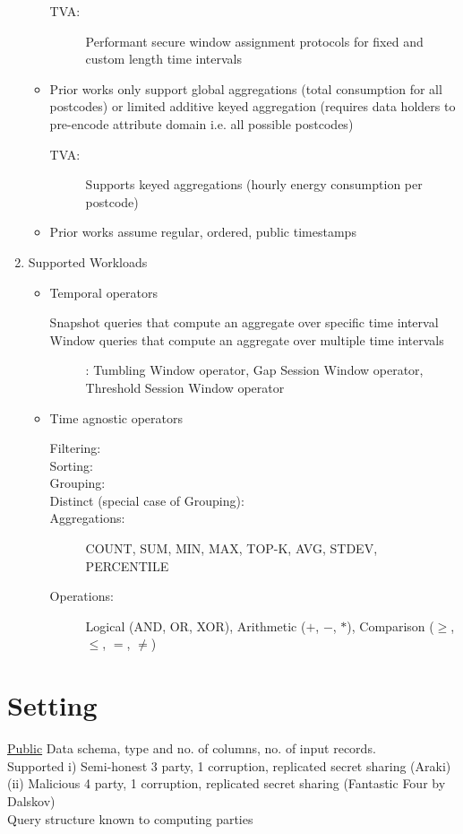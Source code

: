 \documentclass{article}
\begin{document}
\begin{enumerate}
\begin{itemize}
\begin{description}
            \item[TVA:] Performant secure window assignment protocols for fixed and custom length time intervals
        \end{description}
       \item Prior works only support global aggregations (total consumption for all postcodes) or limited additive keyed aggregation (requires data holders to pre-encode attribute domain i.e. all possible postcodes)
         \begin{description}
            \item[TVA:] Supports keyed aggregations (hourly energy consumption per postcode)
        \end{description}
       \item Prior works assume regular, ordered, public timestamps
    \end{itemize}
    \item Supported Workloads
    \begin{itemize}
       \item Temporal operators 
        \begin{description}
            \item[Snapshot queries that compute an aggregate over specific time interval]
            \item[Window queries that compute an aggregate over multiple time intervals]: Tumbling Window operator, Gap Session Window operator, Threshold Session Window operator
        \end{description}
       \item Time agnostic operators 
         \begin{description}
            \item[Filtering:] 
            \item[Sorting:] 
            \item[Grouping:] 
            \item[Distinct (special case of Grouping):] 
            \item[Aggregations:] COUNT, SUM, MIN, MAX, TOP-K, AVG, STDEV, PERCENTILE
            \item[Operations:] Logical (AND, OR, XOR), Arithmetic ($+$, $-$, $*$), Comparison ($\ge$, $\le$, $=$, $\neq$)
        \end{description}
    \end{itemize}
\end{enumerate}

\section{Setting}
\textbullet{} \underline{Public} Data schema, type and no. of columns, no. of input records. \\
\textbullet{} Supported i) Semi-honest 3 party, 1 corruption, replicated secret sharing (Araki) (ii) Malicious 4 party, 1 corruption, replicated secret sharing (Fantastic Four by Dalskov) \\
\textbullet{} Query structure known to computing parties  
\end{document}
